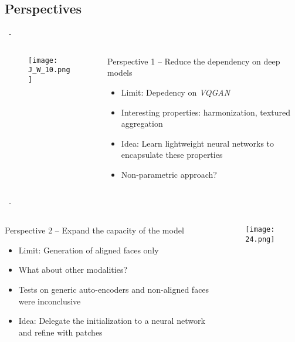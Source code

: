 \documentclass[aspectratio=169, 22pt]{beamer}
\begin{document}
\subsection{Perspectives}
\begin{frame}{\secname~- \subsecname}
  \begin{columns}
    \begin{column}{0.5\linewidth}
      \begin{figure}
        \centering
        \texttt{[image: J\_W\_10.png]}
      \end{figure}
    \end{column}
    \begin{column}{0.5\linewidth}
      \begin{block}{Perspective 1 – Reduce the dependency on deep models}
        \begin{itemize}
        \item \alert{Limit}: Depedency on \emph{VQGAN}
        \item Interesting properties: harmonization, textured aggregation

        \item \alert{Idea}: Learn lightweight neural networks to encapsulate these properties
        \item Non-parametric approach?
        \end{itemize}

      \end{block}
    \end{column}
  \end{columns}
\end{frame}

\begin{frame}{\secname~- \subsecname}
  \begin{columns}
    \begin{column}{0.6\linewidth}
      \begin{block}{Perspective 2 – Expand the capacity of the model}
        \begin{itemize}
        \item \alert{Limit}: Generation of aligned faces only
        \item What about other modalities?

        \item Tests on generic auto-encoders and non-aligned faces were inconclusive
        \item \alert{Idea}: Delegate the initialization to a neural
          network and refine with patches
        \end{itemize}
      \end{block}
    \end{column}
    \begin{column}{0.4\linewidth}
      \begin{figure}
        \centering
        \texttt{[image: 24.png]}
      \end{figure}
    \end{column}
  \end{columns}
\end{frame}
\end{document}
